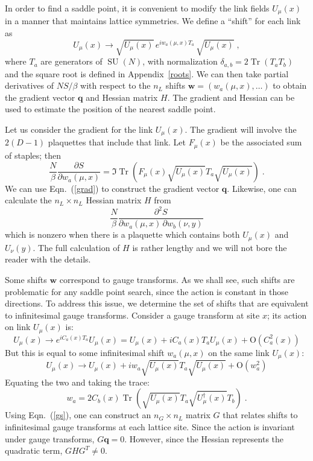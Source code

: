 \documentclass[preprint,aps,prd]{revtex4-2}
\newcommand{\da}{\dagger}  %
\newcommand{\be}{\begin{equation}}
\newcommand{\eq}{\end{equation}}
\DeclareMathOperator{\SU}{SU}
\DeclareMathOperator{\Tr}{Tr}
\begin{document}
In order to find a saddle point, it is convenient to modify
the link fields $U_\mu(x)$ in a manner that maintains lattice symmetries.
We define a ``shift'' for each link as
\be
  U_\mu(x) \to \sqrt{U_\mu(x)}\, e^{i w_{a}(\mu, x) T_a}\, \sqrt{U_\mu(x)} \; ,
    \label{shifts}
\eq
where $T_a$ are generators of $\SU(N)$, with normalization
$\delta_{a,b} = 2 \Tr(T_a T_b)$ and the square root is defined
in Appendix~\ref{roots}.
We can then take partial derivatives of $N S/\beta$ with
respect to the $n_L$ shifts $\mathbf{w} = \left(w_a(\mu, x), \ldots\right)$
to obtain the gradient vector $\mathbf{q}$ and Hessian matrix
$H$.  The gradient and Hessian can be used to estimate the
position of the nearest saddle point.

Let us consider the gradient for the link $U_\mu(x)$.
The gradient will involve the $2 (D-1)$ plaquettes that include that link.
Let $F_\mu(x)$ be the associated sum of staples; then
\be
   \frac{N}{\beta} \frac{\partial S}{\partial w_a(\mu, x)} =
   \Im\Tr\left(F_\mu(x) \sqrt{U_\mu(x)} T_a \sqrt{U_\mu(x)}\right) \; .
   \label{grad}
\eq
We can use Eqn.~(\ref{grad}) to construct the gradient vector $\mathbf{q}$.
Likewise, one can calculate the $n_L\times n_L$ Hessian matrix
$H$ from
\be
      \frac{N}{\beta} \frac{\partial^2 S}{\partial w_a(\mu, x)\, \partial w_b(\nu, y)}
\eq
which is nonzero when there is a plaquette which contains both
$U_\mu(x)$ and $U_\nu(y)$.
The full calculation of $H$ is rather lengthy and we will not bore the reader
with the details.

Some shifts $\mathbf{w}$ correspond to gauge transforms.
As we shall see, such shifts are problematic for any saddle
point search, since the action is constant in those directions.
To address this issue, we determine the set of shifts that are
equivalent to infinitesimal gauge transforms.  Consider a gauge transform
at site $x$; its action on link $U_\mu(x)$ is:
\be
U_\mu(x) \to e^{i C_a(x) T_a} U_\mu(x) = U_\mu(x) + i C_a(x) T_a U_\mu(x) +
       \mathrm{O}\!\left(C_a^2(x)\right)
\eq
But this is equal to some infinitesimal shift $w_a(\mu, x)$ on
the same link $U_\mu(x)$:
\be
U_\mu(x) \to U_\mu(x) + i w_a \sqrt{U_\mu(x)}T_a \sqrt{U_\mu(x)} +
       \mathrm{O}\!\left(w_a^2\right)
\eq
%
Equating the two and taking the trace:
\be
w_a = 2 C_b(x) \Tr\left(\sqrt{U_\mu(x)} T_a
                     \sqrt{U_\mu^\da(x)} T_b\right) \; . \label{gs}
\eq
Using Eqn.~(\ref{gs}), one can construct an $n_G \times n_L$ matrix
$G$ that relates shifts to infinitesimal gauge transforms
at each lattice site.
Since the action is invariant under gauge transforms, $G \mathbf{q} = 0$.
However, since the Hessian represents the quadratic term, $G H G^T \neq 0$.
\end{document}
